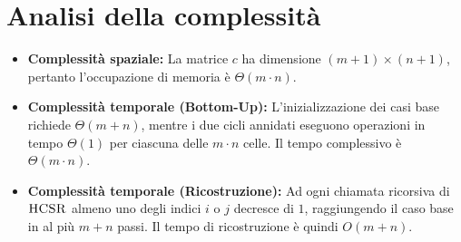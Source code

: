 \section{Analisi della complessità}
\begin{itemize}
    \item \textbf{Complessità spaziale:} La matrice $c$ ha dimensione $(m+1) \times (n+1)$, pertanto l'occupazione di memoria è $\Theta(m \cdot n)$.
    \item \textbf{Complessità temporale (Bottom-Up):} L'inizializzazione dei casi base richiede $\Theta(m + n)$, mentre i due cicli annidati eseguono operazioni in tempo $\Theta(1)$ per ciascuna delle $m \cdot n$ celle. Il tempo complessivo è $\Theta(m \cdot n)$.
    \item \textbf{Complessità temporale (Ricostruzione):} Ad ogni chiamata ricorsiva di $\textsc{HCSR}$ almeno uno degli indici $i$ o $j$ decresce di $1$, raggiungendo il caso base in al più $m + n$ passi. Il tempo di ricostruzione è quindi $O(m + n)$.
\end{itemize}